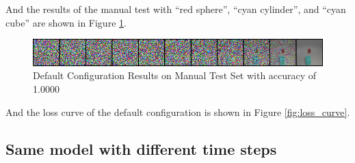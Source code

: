 And the results of the manual test with ``red sphere'', ``cyan cylinder'', and ``cyan cube'' are shown in Figure \ref{fig:default_manual}.
\begin{figure}[H]
    \centering
    \includegraphics[width=\textwidth]{figures/default_manual_test.png}
    \caption{Default Configuration Results on Manual Test Set with accuracy of 1.0000}
    \label{fig:default_manual}
\end{figure}

And the loss curve of the default configuration is shown in Figure \ref{fig:loss_curve}.

\subsection{Same model with different time steps}

